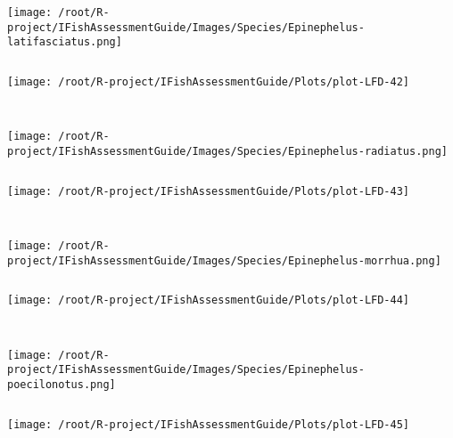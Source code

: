 \begin{knitrout}
\begin{kframe}
\begin{verbatim}
\end{verbatim}
\end{kframe}
\texttt{[image: /root/R-project/IFishAssessmentGuide/Images/Species/Epinephelus-latifasciatus.png]}
\begin{kframe}\begin{verbatim}
\end{verbatim}
\end{kframe}
\texttt{[image: /root/R-project/IFishAssessmentGuide/Plots/plot-LFD-42]} 
\begin{kframe}\begin{verbatim}
 
\end{verbatim}
\end{kframe}
\texttt{[image: /root/R-project/IFishAssessmentGuide/Images/Species/Epinephelus-radiatus.png]}
\begin{kframe}\begin{verbatim}
\end{verbatim}
\end{kframe}
\texttt{[image: /root/R-project/IFishAssessmentGuide/Plots/plot-LFD-43]} 
\begin{kframe}\begin{verbatim}
 
\end{verbatim}
\end{kframe}
\texttt{[image: /root/R-project/IFishAssessmentGuide/Images/Species/Epinephelus-morrhua.png]}
\begin{kframe}\begin{verbatim}
\end{verbatim}
\end{kframe}
\texttt{[image: /root/R-project/IFishAssessmentGuide/Plots/plot-LFD-44]} 
\begin{kframe}\begin{verbatim}
 
\end{verbatim}
\end{kframe}
\texttt{[image: /root/R-project/IFishAssessmentGuide/Images/Species/Epinephelus-poecilonotus.png]}
\begin{kframe}\begin{verbatim}
\end{verbatim}
\end{kframe}
\texttt{[image: /root/R-project/IFishAssessmentGuide/Plots/plot-LFD-45]} 
\begin{kframe}\begin{verbatim}
 

\end{verbatim}
\end{kframe}
\end{knitrout}
